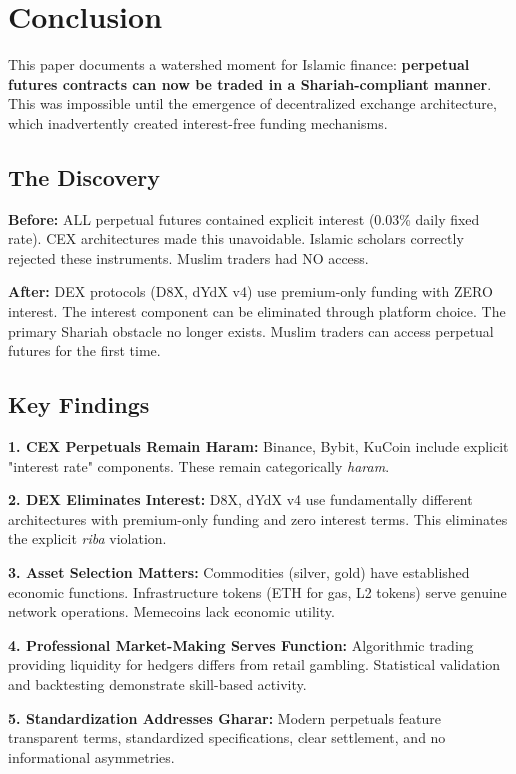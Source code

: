 \documentclass[10pt,twocolumn]{article}
\begin{document}
\section{Conclusion}

This paper documents a watershed moment for Islamic finance: \textbf{perpetual futures contracts can now be traded in a Shariah-compliant manner}. This was impossible until the emergence of decentralized exchange architecture, which inadvertently created interest-free funding mechanisms.

\subsection{The Discovery}

\textbf{Before:} ALL perpetual futures contained explicit interest (0.03\% daily fixed rate). CEX architectures made this unavoidable. Islamic scholars correctly rejected these instruments. Muslim traders had NO access.

\textbf{After:} DEX protocols (D8X, dYdX v4) use premium-only funding with ZERO interest. The interest component can be eliminated through platform choice. The primary Shariah obstacle no longer exists. Muslim traders can access perpetual futures for the first time.

\subsection{Key Findings}

\textbf{1. CEX Perpetuals Remain Haram:} Binance, Bybit, KuCoin include explicit "interest rate" components. These remain categorically \textit{haram}.

\textbf{2. DEX Eliminates Interest:} D8X, dYdX v4 use fundamentally different architectures with premium-only funding and zero interest terms. This eliminates the explicit \textit{riba} violation.

\textbf{3. Asset Selection Matters:} Commodities (silver, gold) have established economic functions. Infrastructure tokens (ETH for gas, L2 tokens) serve genuine network operations. Memecoins lack economic utility.

\textbf{4. Professional Market-Making Serves Function:} Algorithmic trading providing liquidity for hedgers differs from retail gambling. Statistical validation and backtesting demonstrate skill-based activity.

\textbf{5. Standardization Addresses Gharar:} Modern perpetuals feature transparent terms, standardized specifications, clear settlement, and no informational asymmetries.
\end{document}
